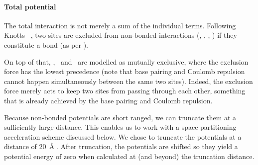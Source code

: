 \paragraph{Total potential}
The total interaction is not merely a sum of the individual terms.
Following Knotts \etal\ \cite{knotts2007coarse}, two sites are excluded from non-bonded interactions (\Vstck, \Vbp, \Vqq, \Vexcl) if they constitute a bond (as per \Vbond).

On top of that, \Vbp, \Vqq\ and \Vexcl\ are modelled as mutually exclusive, where the exclusion force has the lowest precedence (note that base pairing and Coulomb repulsion cannot happen simultaneously between the same two sites).
Indeed, the exclusion force merely acts to keep two sites from passing through each other, something that is already achieved by the base pairing and Coulomb repulsion.

Because non-bonded potentials are short ranged, we can truncate them at a sufficiently large distance.
This enables us to work with a space partitioning acceleration scheme discussed below.
We chose to truncate the potentials at a distance of $20\,\Angstrom$. After truncation, the potentials are shifted so they yield a potential energy of zero when calculated at (and beyond) the truncation distance.



